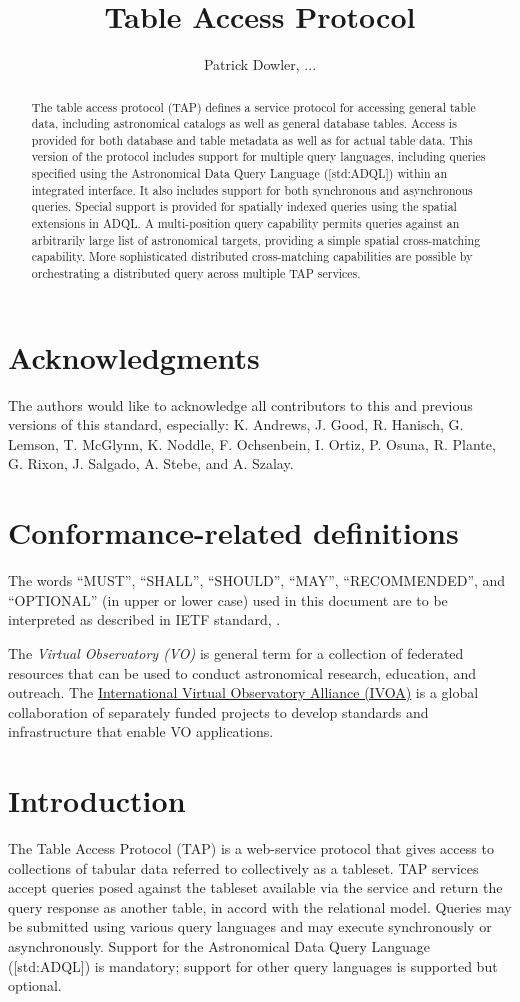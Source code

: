 \documentclass[11pt,letter]{ivoa}
\title{Table Access Protocol}
\author{Patrick Dowler, ...}
\begin{document}
\begin{abstract}
The table access protocol (TAP) defines a service protocol for accessing general 
table data, including astronomical catalogs as well as general database tables. 
Access is provided for both database and table metadata as well as for actual 
table data. This version of the protocol includes support for multiple query 
languages, including queries specified using the Astronomical Data Query 
Language ([std:ADQL]) within an integrated interface. It also includes support 
for both synchronous and asynchronous queries. Special support is provided for
spatially indexed queries using the spatial extensions in ADQL. A multi-position 
query capability permits queries against an arbitrarily large list of 
astronomical targets, providing a simple spatial cross-matching capability. 
More sophisticated distributed cross-matching capabilities are possible by 
orchestrating a distributed query across multiple TAP services.  
\end{abstract}


\section*{Acknowledgments}

The authors would like to acknowledge all contributors to this and previous 
versions of this standard, especially: K. Andrews, J. Good, R. Hanisch, G. 
Lemson, T. McGlynn, K. Noddle, F. Ochsenbein, I. Ortiz, P. Osuna, R. Plante, G. 
Rixon, J. Salgado, A. Stebe, and A. Szalay.


\section*{Conformance-related definitions}

The words ``MUST'', ``SHALL'', ``SHOULD'', ``MAY'', ``RECOMMENDED'', and
``OPTIONAL'' (in upper or lower case) used in this document are to be
interpreted as described in IETF standard, \citet{std:RFC2119}.

The \emph{Virtual Observatory (VO)} is general term for a collection of 
federated resources that can be used to conduct astronomical research, 
education, and outreach. The \href{http://www.ivoa.net}{International
Virtual Observatory Alliance (IVOA)} is a global collaboration of separately 
funded projects to develop standards and infrastructure that enable VO 
applications.


\section{Introduction}
The Table Access Protocol (TAP) is a web-service protocol that gives access to 
collections of tabular data referred to collectively as a tableset.  TAP 
services accept queries posed against the tableset available via the service and 
return the query response as another table, in accord with the relational model. 
 Queries may be submitted using various query languages and may execute 
synchronously or asynchronously. Support for the Astronomical Data Query 
Language ([std:ADQL]) is mandatory; support for other query languages is supported 
but optional.
\end{document}
